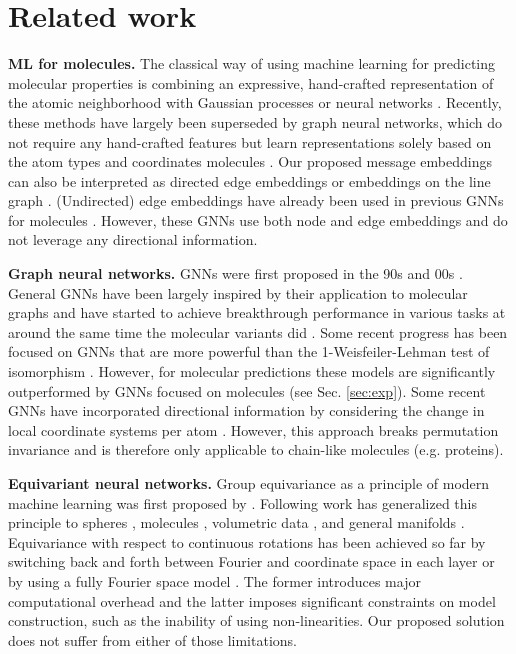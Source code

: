 \documentclass{article} \usepackage{iclr2020_conference,times}
\begin{document}
\section{Related work}



\textbf{ML for molecules.} The classical way of using machine learning for predicting molecular properties is combining an expressive, hand-crafted representation of the atomic neighborhood \citep{bartok_representing_2013} with Gaussian processes \citep{bartok_gaussian_2010,bartok_machine_2017,chmiela_machine_2017} or neural networks \citep{behler_generalized_2007}. Recently, these methods have largely been superseded by graph neural networks, which do not require any hand-crafted features but learn representations solely based on the atom types and coordinates molecules \citep{duvenaud_convolutional_2015,gilmer_neural_2017,schutt_schnet:_2017,hy_predicting_2018,unke_physnet:_2019}. Our proposed message embeddings can also be interpreted as directed edge embeddings or embeddings on the line graph \citep{chen_supervised_2019}. (Undirected) edge embeddings have already been used in previous GNNs for molecules \citep{jorgensen_neural_2018,chen_graph_2019}. However, these GNNs use both node and edge embeddings and do not leverage any directional information.

\textbf{Graph neural networks.} GNNs were first proposed in the 90s \citep{baskin_neural_1997,sperduti_supervised_1997} and 00s \citep{gori_new_2005,scarselli_graph_2009}. General GNNs have been largely inspired by their application to molecular graphs and have started to achieve breakthrough performance in various tasks at around the same time the molecular variants did \citep{kipf_semi-supervised_2017,klicpera_predict_2019,zambaldi_deep_2019}. Some recent progress has been focused on GNNs that are more powerful than the 1-Weisfeiler-Lehman test of isomorphism \citep{morris_weisfeiler_2019,maron_provably_2019}. However, for molecular predictions these models are significantly outperformed by GNNs focused on molecules (see Sec. \ref{sec:exp}). Some recent GNNs have incorporated directional information by considering the change in local coordinate systems per atom \citep{ingraham_generative_2019}. However, this approach breaks permutation invariance and is therefore only applicable to chain-like molecules (e.g. proteins).

\textbf{Equivariant neural networks.} Group equivariance as a principle of modern machine learning was first proposed by \citet{cohen_group_2016}. Following work has generalized this principle to spheres \citep{cohen_spherical_2018}, molecules \citep{thomas_tensor_2018}, volumetric data \citep{weiler_3d_2018}, and general manifolds \citep{cohen_gauge_2019}. Equivariance with respect to continuous rotations has been achieved so far by switching back and forth between Fourier and coordinate space in each layer \citep{cohen_spherical_2018} or by using a fully Fourier space model \citep{kondor_clebsch-gordan_2018,anderson_cormorant:_2019}. The former introduces major computational overhead and the latter imposes significant constraints on model construction, such as the inability of using non-linearities. Our proposed solution does not suffer from either of those limitations.
\end{document}
